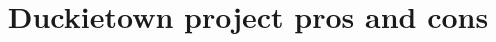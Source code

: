 \documentclass[conference]{IEEEtran}
\begin{document}
%
\title{Duckietown project pros and cons}









\end{document}
